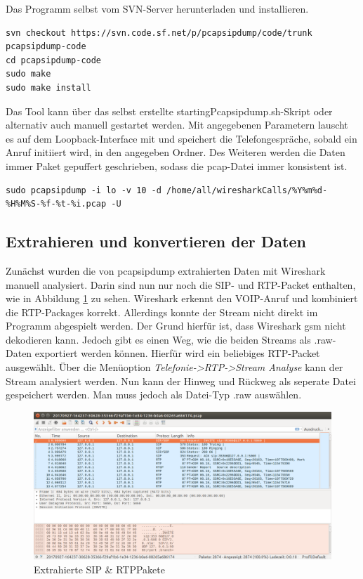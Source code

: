 Das Programm selbst vom SVN-Server herunterladen und installieren.
\begin{lstlisting}
svn checkout https://svn.code.sf.net/p/pcapsipdump/code/trunk pcapsipdump-code
cd pcapsipdump-code
sudo make
sudo make install
\end{lstlisting}

Das Tool kann über das selbst erstellte startingPcapsipdump.sh-Skript oder alternativ auch manuell gestartet werden. Mit angegebenen Parametern lauscht es auf dem Loopback-Interface mit und speichert die Telefongespräche, sobald ein Anruf initiiert wird, in den angegeben Ordner. Des Weiteren werden die Daten immer Paket gepuffert geschrieben, sodass die pcap-Datei immer konsistent ist.
\begin{lstlisting}
sudo pcapsipdump -i lo -v 10 -d /home/all/wiresharkCalls/%Y%m%d-%H%M%S-%f-%t-%i.pcap -U
\end{lstlisting}

\subsection{Extrahieren und konvertieren der Daten}\label{extractData}
Zunächst wurden die von pcapsipdump extrahierten Daten mit Wireshark manuell analysiert. Darin sind nun nur noch die SIP- und RTP-Packet enthalten, wie in Abbildung \ref{fig:wSipRTP} zu sehen. Wireshark erkennt den VOIP-Anruf und kombiniert die RTP-Packages korrekt. Allerdings konnte der Stream nicht direkt im Programm abgespielt werden. Der Grund hierfür ist, dass Wireshark gsm nicht dekodieren kann.
Jedoch gibt es einen Weg, wie die beiden Streams als .raw-Daten exportiert werden können. Hierfür wird ein beliebiges RTP-Packet ausgewählt. Über die Menüoption \textit{Telefonie->RTP->Stream Analyse} kann der Stream analysiert werden. Nun kann der Hinweg und Rückweg als seperate Datei gespeichert werden. Man muss jedoch als Datei-Typ .raw auswählen.\\

\begin{figure}[h] %
\centering
\includegraphics[width=15cm]{includes/w_SIPRTP}
\caption{Extrahierte SIP\- \& RTP\-Pakete}
\label{fig:wSipRTP}
\end{figure}

